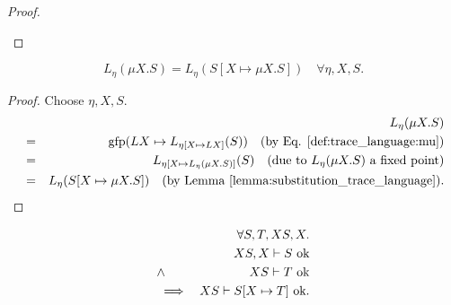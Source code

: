 \documentclass{llncs}
\newcommand*{\gfp}{\mathrm{gfp}}
\newcommand*{\envimpl}       [2]{#1 \vdash #2}
\newcommand*{\envimplok}     [2]{\envimpl{#1}{\text{$#2$ {\normalfont \rmfamily ok}}}}
\renewcommand*{\|}{\;|\;}
\begin{document}
\begin{proof}
\begin{enumerate}
  \end{enumerate}
\end{proof}

\begin{lemma}
  \label{lemma:mu_expansion_trace_language}
  \begin{equation*}
    L_\eta(\mu X.S) = L_\eta(S[X \mapsto \mu X.S]) \quad \forall \eta, X, S.
  \end{equation*}
\end{lemma}

\begin{proof}
  Choose $\eta, X, S$.
  \begin{eqnarray*}
    &&  L_\eta(\mu X.S) \\
    &=& \gfp(LX \mapsto L_{\eta[X \mapsto LX]}(S))
        \quad \text{(by Eq. \ref{def:trace_language:mu})} \\
    &=& L_{\eta[X \mapsto L_\eta(\mu X.S)]}(S)
        \quad \text{(due to $L_\eta(\mu X.S)$ a fixed point)} \\
    &=& L_\eta(S[X \mapsto \mu X.S])
        \quad \text{(by Lemma \ref{lemma:substitution_trace_language})}.
  \end{eqnarray*}
\end{proof}

\begin{lemma}
  \label{lemma:substitution_wellformedness}
  \begin{eqnarray*}
    &&         \forall S, T, XS, X. \\
    &&         \envimplok{XS, X}{S} \\
    &\land&    \envimplok{XS}{T} \\
    &\implies& \envimplok{XS}{S[X \mapsto T]}.
  \end{eqnarray*}
\end{lemma}
\end{document}
